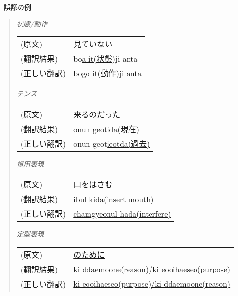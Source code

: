 \begin{flushleft}
　誤謬の例
\end{flushleft}
\begin{quote}

\begin{flushleft}
{\it 状態/動作}
\end{flushleft}

\begin{tabular}{ll}
 (原文)     &  見ていない \\
 (翻訳結果) &  bo\underline{a it(状態)}ji anta \\
 (正しい翻訳) & bo\underline{go it(動作)}ji anta \\
\end{tabular}

\vspace{0.5cm}

\begin{flushleft}
{\it テンス}
\end{flushleft}

\begin{tabular}{ll}
 (原文)    &  来るの\underline{だった} \\
 (翻訳結果) &  onun geot\underline{ida(現在)} \\
 (正しい翻訳) & onun geot\underline{ieotda(過去)} \\
\end{tabular}

\vspace{0.5cm}

\begin{flushleft}
{\it 慣用表現}
\end{flushleft}

\begin{tabular}{ll}
 (原文)     &  \underline{口をはさむ} \\
 (翻訳結果)  & \underline{ibul kida(insert mouth)} \\
 (正しい翻訳) & \underline{chamgyeonul hada(interfere)} \\
\end{tabular}

\vspace{0.5cm}

\begin{flushleft}
{\it 定型表現}
\end{flushleft}

\begin{tabular}{ll}
 (原文)      & \underline{のために} \\
 (翻訳結果)  & \underline{ki ddaemoone(reason)/ki eooihaeseo(purpose)} \\
 (正しい翻訳) & \underline{ki eooihaeseo(purpose)/ki ddaemoone(reason)} \\
\end{tabular}


\end{quote}
